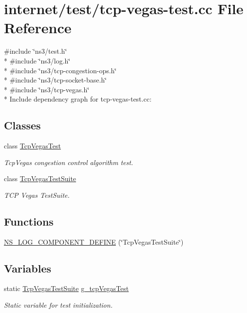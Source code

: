 \hypertarget{tcp-vegas-test_8cc}{}\section{internet/test/tcp-\/vegas-\/test.cc File Reference}
\label{tcp-vegas-test_8cc}
{\ttfamily \#include \char`\"{}ns3/test.\+h\char`\"{}}\\*
{\ttfamily \#include \char`\"{}ns3/log.\+h\char`\"{}}\\*
{\ttfamily \#include \char`\"{}ns3/tcp-\/congestion-\/ops.\+h\char`\"{}}\\*
{\ttfamily \#include \char`\"{}ns3/tcp-\/socket-\/base.\+h\char`\"{}}\\*
{\ttfamily \#include \char`\"{}ns3/tcp-\/vegas.\+h\char`\"{}}\\*
Include dependency graph for tcp-\/vegas-\/test.cc\+:
\subsection*{Classes}
\begin{DoxyCompactItemize}
\item 
class \hyperlink{classTcpVegasTest}{Tcp\+Vegas\+Test}
\begin{DoxyCompactList}\small\item\em Tcp\+Vegas congestion control algorithm test. \end{DoxyCompactList}\item 
class \hyperlink{classTcpVegasTestSuite}{Tcp\+Vegas\+Test\+Suite}
\begin{DoxyCompactList}\small\item\em T\+CP Vegas Test\+Suite. \end{DoxyCompactList}\end{DoxyCompactItemize}
\subsection*{Functions}
\begin{DoxyCompactItemize}
\item 
\hyperlink{tcp-vegas-test_8cc_a5093bcd64ea741da5fb7e5dbcac38620}{N\+S\+\_\+\+L\+O\+G\+\_\+\+C\+O\+M\+P\+O\+N\+E\+N\+T\+\_\+\+D\+E\+F\+I\+NE} (\char`\"{}Tcp\+Vegas\+Test\+Suite\char`\"{})
\end{DoxyCompactItemize}
\subsection*{Variables}
\begin{DoxyCompactItemize}
\item 
static \hyperlink{classTcpVegasTestSuite}{Tcp\+Vegas\+Test\+Suite} \hyperlink{tcp-vegas-test_8cc_a18c8adb58fbce0d154fdb06474a4f40c}{g\+\_\+tcp\+Vegas\+Test}
\begin{DoxyCompactList}\small\item\em Static variable for test initialization. \end{DoxyCompactList}\end{DoxyCompactItemize}


